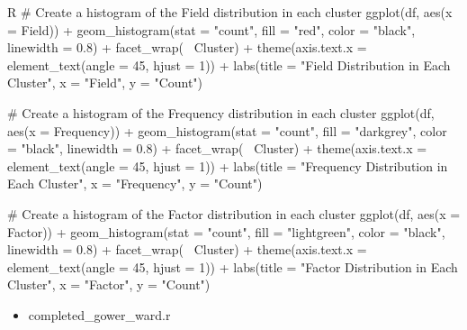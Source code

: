 \begin{code}{R}
            # Create a histogram of the Field distribution in each cluster
            ggplot(df, aes(x = Field)) +
              geom_histogram(stat = "count", fill = "red", color = "black", linewidth = 0.8) +
              facet_wrap(~ Cluster) +
              theme(axis.text.x = element_text(angle = 45, hjust = 1)) +
              labs(title = "Field Distribution in Each Cluster", x = "Field", y = "Count")
            
            # Create a histogram of the Frequency distribution in each cluster
            ggplot(df, aes(x = Frequency)) +
              geom_histogram(stat = "count", fill = "darkgrey", color = "black", linewidth = 0.8) +
              facet_wrap(~ Cluster) +
              theme(axis.text.x = element_text(angle = 45, hjust = 1)) +
              labs(title = "Frequency Distribution in Each Cluster", x = "Frequency", y = "Count")
            
            # Create a histogram of the Factor distribution in each cluster
            ggplot(df, aes(x = Factor)) +
              geom_histogram(stat = "count", fill = "lightgreen", color = "black", linewidth = 0.8) +
              facet_wrap(~ Cluster) +
              theme(axis.text.x = element_text(angle = 45, hjust = 1)) +
              labs(title = "Factor Distribution in Each Cluster", x = "Factor", y = "Count")
        \end{code}


         \begin{itemize}
            \item completed\_gower\_ward.r
        \end{itemize}

